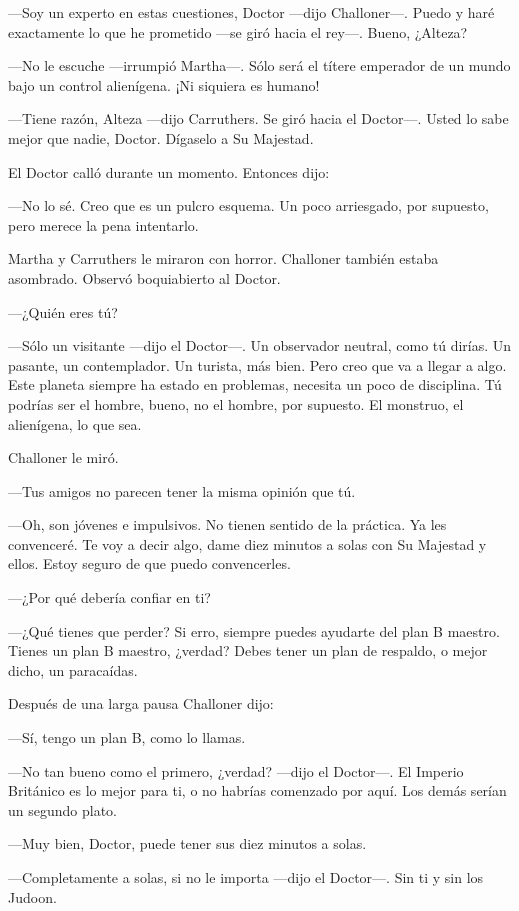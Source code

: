 ---Soy un experto en estas cuestiones, Doctor ---dijo Challoner---.
Puedo y haré exactamente lo que he prometido ---se giró hacia el rey---.
Bueno, ¿Alteza?

---No le escuche ---irrumpió Martha---. Sólo será el títere emperador de
un mundo bajo un control alienígena. ¡Ni siquiera es humano!

---Tiene razón, Alteza ---dijo Carruthers. Se giró hacia el Doctor---.
Usted lo sabe mejor que nadie, Doctor. Dígaselo a Su Majestad.

El Doctor calló durante un momento. Entonces dijo:

---No lo sé. Creo que es un pulcro esquema. Un poco arriesgado, por
supuesto, pero merece la pena intentarlo.

Martha y Carruthers le miraron con horror. Challoner también estaba
asombrado. Observó boquiabierto al Doctor.

---¿Quién eres tú?

---Sólo un visitante ---dijo el Doctor---. Un observador neutral, como
tú dirías. Un pasante, un contemplador. Un turista, más bien. Pero creo
que va a llegar a algo. Este planeta siempre ha estado en problemas,
necesita un poco de disciplina. Tú podrías ser el hombre, bueno, no el
hombre, por supuesto. El monstruo, el alienígena, lo que sea.

Challoner le miró.

---Tus amigos no parecen tener la misma opinión que tú.

---Oh, son jóvenes e impulsivos. No tienen sentido de la práctica. Ya
les convenceré. Te voy a decir algo, dame diez minutos a solas con Su
Majestad y ellos. Estoy seguro de que puedo convencerles.

---¿Por qué debería confiar en ti?

---¿Qué tienes que perder? Si erro, siempre puedes ayudarte del plan B
maestro. Tienes un plan B maestro, ¿verdad? Debes tener un plan de
respaldo, o mejor dicho, un paracaídas.

Después de una larga pausa Challoner dijo:

---Sí, tengo un plan B, como lo llamas.

---No tan bueno como el primero, ¿verdad? ---dijo el Doctor---. El
Imperio Británico es lo mejor para ti, o no habrías comenzado por aquí.
Los demás serían un segundo plato.

---Muy bien, Doctor, puede tener sus diez minutos a solas.

---Completamente a solas, si no le importa ---dijo el Doctor---. Sin ti
y sin los Judoon.

